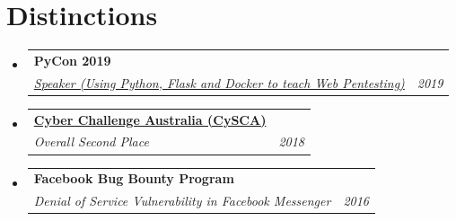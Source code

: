 \documentclass[letterpaper,11pt]{article}
\makeatletter
\newcommand{\resumeSubheading}[4]{
  \vspace{-1pt}\item
    \begin{tabular*}{0.97\textwidth}[t]{l@{\extracolsep{\fill}}r}
      \textbf{#1} & #2 \\
      \textit{\small#3} & \textit{\small #4} \\
    \end{tabular*}\vspace{-5pt}
}
\newcommand{\resumeSubHeadingListStart}{\begin{itemize}[leftmargin=0pt,label={}]}
\newcommand{\resumeSubHeadingListEnd}{\end{itemize}}
\makeatother
\begin{document}
  
\section{Distinctions}
  \resumeSubHeadingListStart
    \resumeSubheading
      {PyCon 2019}{}
      {\href{https://www.youtube.com/watch?v=l0Sazyzs1IY}{Speaker (Using Python, Flask and Docker to teach Web Pentesting)}}{2019}
  \resumeSubheading
      {\href{https://www.cyberchallenge.com.au/}{Cyber Challenge Australia (CySCA)}}{}
      {Overall Second Place}{2018}
  \resumeSubheading
      {Facebook Bug Bounty Program }{}
      {Denial of Service Vulnerability in Facebook Messenger}{2016}
  \resumeSubHeadingListEnd
\end{document}
